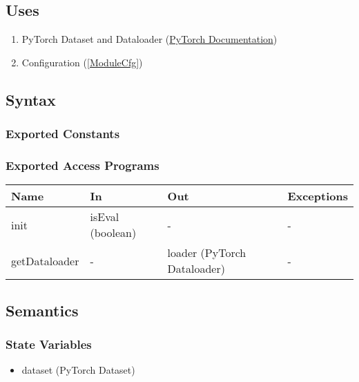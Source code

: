 \documentclass[12pt, titlepage]{article}
\begin{document}
\subsection{Uses}
\begin{enumerate}
  \item PyTorch Dataset and Dataloader (\href{https://pytorch.org/tutorials/beginner/basics/data_tutorial.html}{PyTorch Documentation})
  \item Configuration (\ref{ModuleCfg})
\end{enumerate}

\subsection{Syntax}



\subsubsection{Exported Constants}



\subsubsection{Exported Access Programs}

\begin{center}
\begin{tabular}{p{3cm}|p{5cm}|p{4cm}|p{2cm}}
\hline
\textbf{Name} & \textbf{In} & \textbf{Out} & \textbf{Exceptions} \\
\hline
init & isEval (boolean) & - & - \\
\hline
getDataloader & - & loader (PyTorch Dataloader) & -  \\
\hline
\end{tabular}
\end{center}

\subsection{Semantics}

\subsubsection{State Variables}
\begin{itemize}
  \item dataset (PyTorch Dataset)
\end{itemize}
\end{document}
